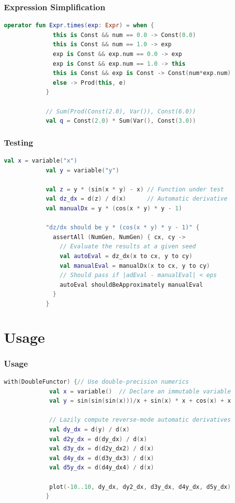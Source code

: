 \documentclass{beamer}
\begin{document}
    \begin{frame}[fragile]
        \frametitle{Expression Simplification}
        \begin{lstlisting}[language=Kotlin, gobble=12]
            operator fun Expr.times(exp: Expr) = when {
              this is Const && num == 0.0 -> Const(0.0)
              this is Const && num == 1.0 -> exp
              exp is Const && exp.num == 0.0 -> exp
              exp is Const && exp.num == 1.0 -> this
              this is Const && exp is Const -> Const(num*exp.num)
              else -> Prod(this, e)
            }

            // Sum(Prod(Const(2.0), Var()), Const(6.0))
            val q = Const(2.0) * Sum(Var(), Const(3.0))
        \end{lstlisting}
    \end{frame}

    \begin{frame}[fragile]
        \frametitle{Testing}
        \begin{lstlisting}[language=Kotlin, gobble=12]
            val x = variable("x")
            val y = variable("y")

            val z = y * (sin(x * y) - x) // Function under test
            val dz_dx = d(z) / d(x)      // Automatic derivative
            val manualDx = y * (cos(x * y) * y - 1)

            "dz/dx should be y * (cos(x * y) * y - 1)" {
              assertAll (NumGen, NumGen) { cx, cy ->
                // Evaluate the results at a given seed
                val autoEval = dz_dx(x to cx, y to cy)
                val manualEval = manualDx(x to cx, y to cy)
                // Should pass if |adEval - manualEval| < eps
                autoEval shouldBeApproximately manualEval
              }
            }
        \end{lstlisting}
    \end{frame}

    \section{Usage}\label{sec:fourth-section}

    \begin{frame}[fragile]
        \frametitle{Usage}
        \begin{lstlisting}[language=Kotlin, gobble=12]
            with(DoubleFunctor) {// Use double-precision numerics
             val x = variable()  // Declare an immutable variable
             val y = sin(sin(sin(x)))/x + sin(x) * x + cos(x) + x

             // Lazily compute reverse-mode automatic derivatives
             val dy_dx = d(y) / d(x)
             val d2y_dx = d(dy_dx) / d(x)
             val d3y_dx = d(d2y_dx2) / d(x)
             val d4y_dx = d(d3y_dx3) / d(x)
             val d5y_dx = d(d4y_dx4) / d(x)

             plot(-10..10, dy_dx, dy2_dx, d3y_dx, d4y_dx, d5y_dx)
            }
        \end{lstlisting}
    \end{frame}
\end{document}
